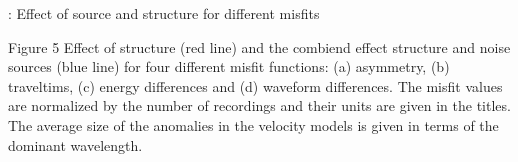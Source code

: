 

\begin{frame}[c]{\titleprefix: Effect of source and structure
  for different misfits}

  \centering

  \begin{minipage}{0.5\textwidth}
  \end{minipage}
  \hspace{0.5cm}
  \begin{minipage}{0.42\textwidth}
    \tiny
    \begin{figureblock}{Figure 5}
      Effect of structure (red line) and the combiend effect structure and noise
      sources (blue line) for four different misfit functions: (a) asymmetry,
      (b) traveltims, (c) energy differences and (d) waveform differences.
      The misfit values are normalized by the number of recordings and their
      units are given in the titles.
      The average size of the anomalies in the velocity models is given in terms
      of the dominant wavelength.
    \end{figureblock}
  \end{minipage}

\end{frame}

